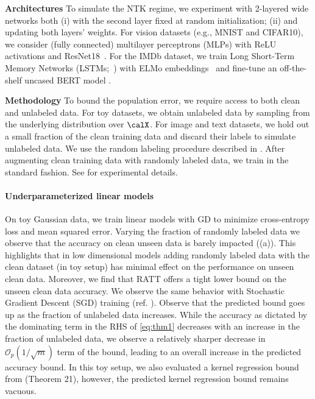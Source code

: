 \noindent \textbf{Architectures {} {}} 
To simulate the NTK regime, 
we experiment with 2-layered wide networks 
both (i) with the second layer fixed 
at random initialization;
(ii) and updating both layers' weights.
For vision datasets (e.g., MNIST and CIFAR10),
we consider (fully connected) 
multilayer perceptrons (MLPs) 
with ReLU activations
and ResNet18~\citep{he2016deep}. 
For the IMDb dataset, we train Long Short-Term Memory Networks 
(LSTMs;~\citet{hochreiter1997long}) with ELMo embeddings~\citep{Peters:2018} 
and
fine-tune an off-the-shelf uncased BERT model
\citep{devlin2018bert, wolf-etal-2020-transformers}. 
\vspace{5pt}

\noindent \textbf{Methodology {} {}} 
To bound the population error,
we require access to both 
clean
and unlabeled data.
For toy datasets, we obtain unlabeled data 
by sampling from the underlying distribution over $\calX$. 
For 
image and text datasets, 
we hold out a small fraction 
of the clean training data 
and discard their 
labels
to simulate unlabeled data.
We use the random labeling procedure 
described
in . 
After augmenting clean training data 
with randomly labeled data, 
we train in the standard fashion. 
See  for experimental details. 

\paragraph{Underparameterized linear models}
On toy Gaussian data, 
we train linear models 
with GD to minimize cross-entropy loss 
and mean squared error.
Varying the fraction of randomly labeled data 
we observe that the accuracy 
on clean unseen data 
is barely impacted
((a)). 
This highlights that in low dimensional models 
adding randomly labeled data 
with the clean dataset (in toy setup) 
has minimal effect on the performance on unseen clean data. 
Moreover, we find that RATT 
offers a tight lower bound 
on the unseen clean data accuracy. 
We observe the same behavior with 
Stochastic Gradient Descent (SGD) training 
(ref. ).   
Observe that the predicted bound goes up as 
the fraction of unlabeled data increases. 
While the accuracy as dictated by 
the dominating term in the RHS of \eqref{eq:thm1} 
decreases with an increase in the fraction 
of unlabeled data, 
we observe a relatively sharper 
decrease in $\mathcal{O}_p\left({1/\sqrt{m}}\right)$ 
term of the bound, leading to an overall increase 
in the predicted accuracy bound. 
In this toy setup, we also evaluated a kernel 
regression bound from \citet{bartlett2002rademacher} (Theorem 21), 
however, the predicted kernel regression bound remains vacuous. 


